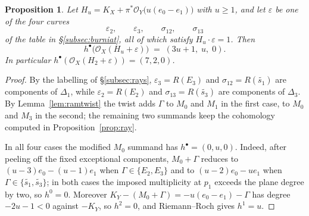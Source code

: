 \documentclass{amsart}
\newtheorem{proposition}[theorem]{Proposition}
\theoremstyle{definition}
\newcommand{\OO}{\mathcal{O}}
\begin{document}
\begin{proposition}\label{prop:twistcoh}
Let $H_u=K_X+\pi^*\OO_Y\bigl(u(e_0-e_1)\bigr)$ with $u\ge1$, and let $\varepsilon$ be one of the four curves
\[
\varepsilon_2,\qquad \varepsilon_3,\qquad \sigma_{12},\qquad \sigma_{13}
\]
of the table in \S\ref{subsec:burniat}, all of which satisfy $H_u\cdot\varepsilon=1$. Then
\[
h^\bullet\bigl(\OO_X(H_u+\varepsilon)\bigr)\;=\;(3u+1,\;u,\;0) .
\]
In particular $h^\bullet(\OO_X(H_2+\varepsilon))=(7,2,0)$.
\end{proposition}

\begin{proof}
By the labelling of \S\ref{subsec:rays}, $\varepsilon_3=R(E_3)$ and $\sigma_{12}=R(\widetilde{s_1})$ are components of $\Delta_1$, while $\varepsilon_2=R(E_2)$ and $\sigma_{13}=R(\widetilde{s_3})$ are components of $\Delta_3$. By Lemma~\ref{lem:ramtwist} the twist adds $\Gamma$ to $M_0$ and $M_1$ in the first case, to $M_0$ and $M_3$ in the second; the remaining two summands keep the cohomology computed in Proposition~\ref{prop:ray}.

In all four cases the modified $M_0$ summand has $h^\bullet=(0,u,0)$. Indeed, after peeling off the fixed exceptional components, $M_0+\Gamma$ reduces to $(u-3)e_0-(u-1)e_1$ when $\Gamma\in\{E_2,E_3\}$ and to $(u-2)e_0-ue_1$ when $\Gamma\in\{\widetilde{s_1},\widetilde{s_3}\}$; in both cases the imposed multiplicity at $p_1$ exceeds the plane degree by two, so $h^0=0$. Moreover $K_Y-(M_0+\Gamma)=-u(e_0-e_1)-\Gamma$ has degree $-2u-1<0$ against $-K_Y$, so $h^2=0$, and Riemann--Roch gives $h^1=u$.


\end{proof}
\end{document}
